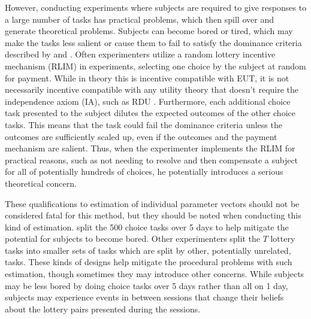 \documentclass[../main.tex]{subfiles}
\begin{document}
However, conducting experiments where subjects are required to give responses to a large number of tasks has practical problems, which then spill over and generate theoretical problems.
Subjects can become bored or tired, which may make the tasks less salient or cause them to fail to satisfy the dominance criteria described by \textcite{Smith1982} and \textcite{Harrison1992}.
Often experimenters utilize a random lottery incentive mechanism (RLIM) in experiments, selecting one choice by the subject at random for payment.
While in theory this is incentive compatible with EUT, it is not necessarily incentive compatible with any utility theory that doesn't require the independence axiom (IA), such as RDU \parencite{Harrison2014, Cox2015}.
Furthermore, each additional choice task presented to the subject dilutes the expected outcomes of the other choice tasks.
This means that the task could fail the dominance criteria unless the outcomes are sufficiently scaled up, even if the outcomes and the payment mechanism are salient.
Thus, when the experimenter implements the RLIM for practical reasons, such as not needing to resolve and then compensate a subject for all of potentially hundreds of choices, he potentially introduces a serious theoretical concern.

These qualifications to estimation of individual parameter vectors should not be considered fatal for this method, but they should be noted when conducting this kind of estimation.
\textcite{Hey2001} split the 500 choice tasks over 5 days to help mitigate the potential for subjects to become bored.
Other experimenters split the $T$ lottery tasks into smaller sets of tasks which are split by other, potentially unrelated, tasks.
These kinds of designs help mitigate the procedural problems with such estimation, though sometimes they may introduce other concerns.
While subjects may be less bored by doing choice tasks over 5 days rather than all on 1 day, subjects may experience events in between sessions that change their beliefs about the lottery pairs presented during the sessions.
\end{document}
